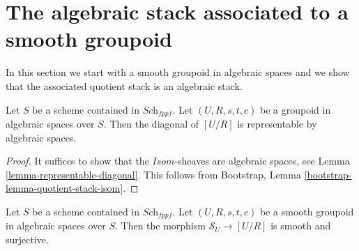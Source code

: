 \section{The algebraic stack associated to a smooth groupoid}
\label{section-smooth-groupoid-gives-algebraic-stack}

\noindent
In this section we start with a smooth groupoid in algebraic spaces
and we show that the associated quotient stack is an algebraic stack.

\begin{lemma}
\label{lemma-diagonal-quotient-stack}
Let $S$ be a scheme contained in $\textit{Sch}_{fppf}$.
Let $(U, R, s, t, c)$ be a groupoid in algebraic spaces over $S$.
Then the diagonal of $[U/R]$ is representable by algebraic spaces.
\end{lemma}

\begin{proof}
It suffices to show that the $\mathit{Isom}$-sheaves are algebraic
spaces, see
Lemma \ref{lemma-representable-diagonal}.
This follows from
Bootstrap, Lemma \ref{bootstrap-lemma-quotient-stack-isom}.
\end{proof}

\begin{lemma}
\label{lemma-smooth-quotient-smooth-presentation}
Let $S$ be a scheme contained in $\textit{Sch}_{fppf}$.
Let $(U, R, s, t, c)$ be a smooth groupoid in algebraic spaces over $S$.
Then the morphism $\mathcal{S}_U \to [U/R]$ is smooth and surjective.
\end{lemma}

